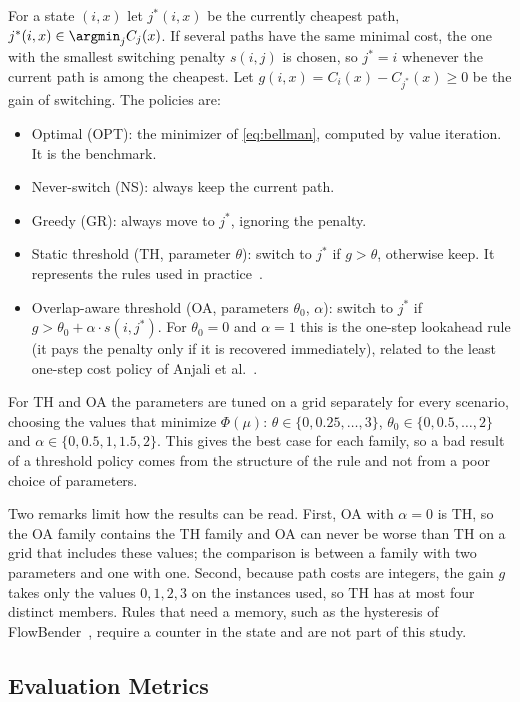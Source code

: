 For a state $(i,x)$ let $j^*(i,x)$ be the currently cheapest path, $j^*(i,x) \in \argmin_j C_j(x)$. If several paths have the same minimal cost, the one with the smallest switching penalty $s(i,j)$ is chosen, so $j^* = i$ whenever the current path is among the cheapest. Let $g(i,x) = C_i(x) - C_{j^*}(x) \ge 0$ be the gain of switching. The policies are:
\begin{itemize}
  \item Optimal (OPT): the minimizer of \eqref{eq:bellman}, computed by value iteration. It is the benchmark.
  \item Never-switch (NS): always keep the current path.
  \item Greedy (GR): always move to $j^*$, ignoring the penalty.
  \item Static threshold (TH, parameter $\theta$): switch to $j^*$ if $g > \theta$, otherwise keep. It represents the rules used in practice~\cite{kikuchi2025,kabbani2014}.
  \item Overlap-aware threshold (OA, parameters $\theta_0$, $\alpha$): switch to $j^*$ if $g > \theta_0 + \alpha \cdot s(i,j^*)$. For $\theta_0 = 0$ and $\alpha = 1$ this is the one-step lookahead rule (it pays the penalty only if it is recovered immediately), related to the least one-step cost policy of Anjali et al.~\cite{anjali2002}.
\end{itemize}
For TH and OA the parameters are tuned on a grid separately for every scenario, choosing the values that minimize $\Phi(\mu)$: $\theta \in \{0, 0.25, \dots, 3\}$, $\theta_0 \in \{0, 0.5, \dots, 2\}$ and $\alpha \in \{0, 0.5, 1, 1.5, 2\}$. This gives the best case for each family, so a bad result of a threshold policy comes from the structure of the rule and not from a poor choice of parameters.

Two remarks limit how the results can be read. First, OA with $\alpha = 0$ is TH, so the OA family contains the TH family and OA can never be worse than TH on a grid that includes these values; the comparison is between a family with two parameters and one with one. Second, because path costs are integers, the gain $g$ takes only the values $0, 1, 2, 3$ on the instances used, so TH has at most four distinct members. Rules that need a memory, such as the hysteresis of FlowBender~\cite{kabbani2014}, require a counter in the state and are not part of this study.

\subsection{Evaluation Metrics}

